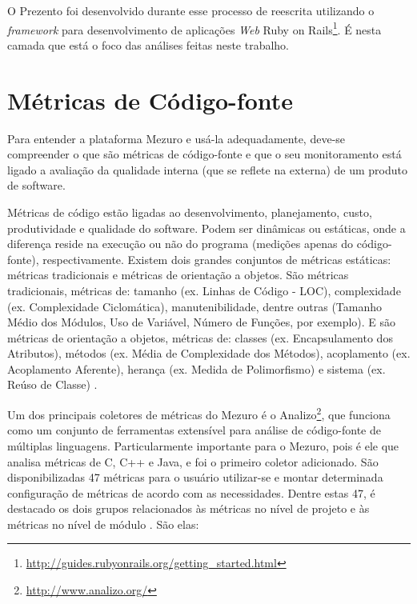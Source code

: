 O Prezento foi desenvolvido durante esse processo de reescrita utilizando o
\textit{framework} para desenvolvimento de aplicações \textit{Web} Ruby on
Rails\footnote{\url{http://guides.rubyonrails.org/getting_started.html}}.
%
É nesta camada que está o foco das análises feitas neste trabalho.

\section{Métricas de Código-fonte}

Para entender a plataforma Mezuro e usá-la adequadamente, deve-se compreender
o que são métricas de código-fonte e que o seu monitoramento está ligado a
avaliação da qualidade interna (que se reflete na externa) de um produto de
software.

Métricas de código estão ligadas ao desenvolvimento, planejamento, custo,
produtividade e qualidade do software. Podem ser dinâmicas ou estáticas, onde a
diferença reside na execução ou não do programa (medições apenas do código-fonte),
respectivamente. Existem dois grandes conjuntos de métricas estáticas:
métricas tradicionais e métricas de orientação a objetos. São métricas
tradicionais, métricas de: tamanho (ex. Linhas de Código - LOC), complexidade
(ex. Complexidade Ciclomática), manutenibilidade, dentre outras (Tamanho Médio
dos Módulos, Uso de Variável, Número de Funções, por exemplo). E são métricas de
orientação a objetos, métricas de: classes (ex. Encapsulamento dos Atributos),
métodos (ex. Média de Complexidade dos Métodos), acoplamento (ex. Acoplamento
Aferente), herança (ex. Medida de Polimorfismo) e sistema (ex. Reúso de Classe)
\cite{meirelles2013monitoramento}.

Um dos principais coletores de métricas do Mezuro é o Analizo\footnote{\url{http://www.analizo.org/}},
que funciona como um conjunto de ferramentas extensível para análise de
código-fonte de múltiplas linguagens. Particularmente importante para o Mezuro,
pois é ele que analisa métricas de C, C++ e Java, e foi o primeiro coletor
adicionado. São disponibilizadas 47 métricas para o usuário utilizar-se e montar
determinada configuração de métricas de acordo com as necessidades. Dentre estas
47, é destacado os dois grupos relacionados às métricas no nível de projeto e às
métricas no nível de módulo \cite{terceiro2010analizo}. São elas:

